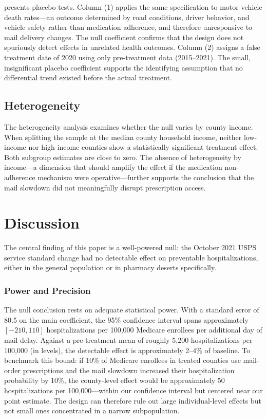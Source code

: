 \documentclass[12pt]{article}
\begin{document}
 presents placebo tests. Column (1) applies the same specification to motor vehicle death rates---an outcome determined by road conditions, driver behavior, and vehicle safety rather than medication adherence, and therefore unresponsive to mail delivery changes. The null coefficient confirms that the design does not spuriously detect effects in unrelated health outcomes. Column (2) assigns a false treatment date of 2020 using only pre-treatment data (2015--2021). The small, insignificant placebo coefficient supports the identifying assumption that no differential trend existed before the actual treatment.

\begingroup\footnotesize\endgroup



\subsection{Heterogeneity}

The heterogeneity analysis examines whether the null varies by county income. When splitting the sample at the median county household income, neither low-income nor high-income counties show a statistically significant treatment effect. Both subgroup estimates are close to zero. The absence of heterogeneity by income---a dimension that should amplify the effect if the medication non-adherence mechanism were operative---further supports the conclusion that the mail slowdown did not meaningfully disrupt prescription access.

\section{Discussion}

The central finding of this paper is a well-powered null: the October 2021 USPS service standard change had no detectable effect on preventable hospitalizations, either in the general population or in pharmacy deserts specifically.

\subsubsection*{Power and Precision} The null conclusion rests on adequate statistical power. With a standard error of 80.5 on the main coefficient, the 95\% confidence interval spans approximately $[-210, 110]$ hospitalizations per 100,000 Medicare enrollees per additional day of mail delay. Against a pre-treatment mean of roughly 5,200 hospitalizations per 100,000 (in levels), the detectable effect is approximately 2--4\% of baseline. To benchmark this bound: if 10\% of Medicare enrollees in treated counties use mail-order prescriptions and the mail slowdown increased their hospitalization probability by 10\%, the county-level effect would be approximately 50 hospitalizations per 100,000---within our confidence interval but centered near our point estimate. The design can therefore rule out large individual-level effects but not small ones concentrated in a narrow subpopulation.
\end{document}
